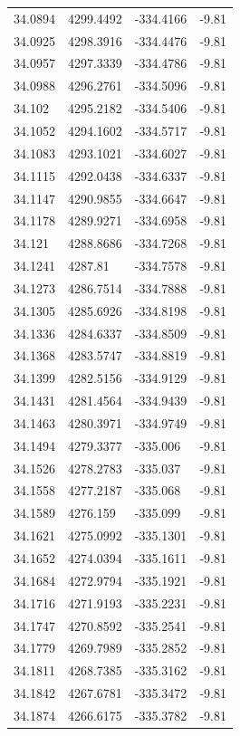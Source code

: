 \begin{table}[H]
\begin{tabular}{llll}
34.0894 & 4299.4492 & -334.4166 & -9.81 \\
34.0925 & 4298.3916 & -334.4476 & -9.81 \\
34.0957 & 4297.3339 & -334.4786 & -9.81 \\
34.0988 & 4296.2761 & -334.5096 & -9.81 \\
34.102 & 4295.2182 & -334.5406 & -9.81 \\
34.1052 & 4294.1602 & -334.5717 & -9.81 \\
34.1083 & 4293.1021 & -334.6027 & -9.81 \\
34.1115 & 4292.0438 & -334.6337 & -9.81 \\
34.1147 & 4290.9855 & -334.6647 & -9.81 \\
34.1178 & 4289.9271 & -334.6958 & -9.81 \\
34.121 & 4288.8686 & -334.7268 & -9.81 \\
34.1241 & 4287.81 & -334.7578 & -9.81 \\
34.1273 & 4286.7514 & -334.7888 & -9.81 \\
34.1305 & 4285.6926 & -334.8198 & -9.81 \\
34.1336 & 4284.6337 & -334.8509 & -9.81 \\
34.1368 & 4283.5747 & -334.8819 & -9.81 \\
34.1399 & 4282.5156 & -334.9129 & -9.81 \\
34.1431 & 4281.4564 & -334.9439 & -9.81 \\
34.1463 & 4280.3971 & -334.9749 & -9.81 \\
34.1494 & 4279.3377 & -335.006 & -9.81 \\
34.1526 & 4278.2783 & -335.037 & -9.81 \\
34.1558 & 4277.2187 & -335.068 & -9.81 \\
34.1589 & 4276.159 & -335.099 & -9.81 \\
34.1621 & 4275.0992 & -335.1301 & -9.81 \\
34.1652 & 4274.0394 & -335.1611 & -9.81 \\
34.1684 & 4272.9794 & -335.1921 & -9.81 \\
34.1716 & 4271.9193 & -335.2231 & -9.81 \\
34.1747 & 4270.8592 & -335.2541 & -9.81 \\
34.1779 & 4269.7989 & -335.2852 & -9.81 \\
34.1811 & 4268.7385 & -335.3162 & -9.81 \\
34.1842 & 4267.6781 & -335.3472 & -9.81 \\
34.1874 & 4266.6175 & -335.3782 & -9.81 \\

\end{tabular}
\end{table}
